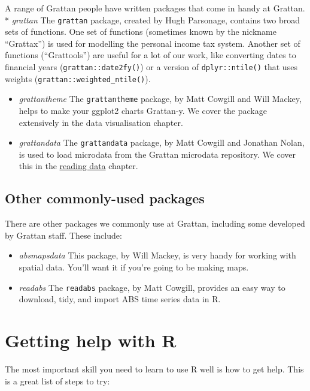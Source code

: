 \documentclass[
]{book}
\begin{document}
A range of Grattan people have written packages that come in handy at Grattan.
* \emph{grattan} The \texttt{grattan} package, created by Hugh Parsonage, contains two broad sets of functions. One set of functions (sometimes known by the nickname ``Grattax'') is used for modelling the personal income tax system. Another set of functions (``Grattools'') are useful for a lot of our work, like converting dates to financial years (\texttt{grattan::date2fy()}) or a version of \texttt{dplyr::ntile()} that uses weights (\texttt{grattan::weighted\_ntile()}).

\begin{itemize}
\item
  \emph{grattantheme} The \texttt{grattantheme} package, by Matt Cowgill and Will Mackey, helps to make your ggplot2 charts Grattan-y. We cover the package extensively in the data visualisation chapter.
\item
  \emph{grattandata} The \texttt{grattandata} package, by Matt Cowgill and Jonathan Nolan, is used to load microdata from the Grattan microdata repository. We cover this in the \protect\hyperlink{reading-data}{reading data} chapter.
\end{itemize}

\hypertarget{other-commonly-used-packages}{%
\section{Other commonly-used packages}\label{other-commonly-used-packages}}

There are other packages we commonly use at Grattan, including some developed by Grattan staff. These include:

\begin{itemize}
\item
  \emph{absmapsdata} This package, by Will Mackey, is very handy for working with spatial data. You'll want it if you're going to be making maps.
\item
  \emph{readabs} The \texttt{readabs} package, by Matt Cowgill, provides an easy way to download, tidy, and import ABS time series data in R.
\end{itemize}

\hypertarget{getting-help-with-r}{%
\chapter{Getting help with R}\label{getting-help-with-r}}

The most important skill you need to learn to use R well is how to get help. This is a great list of steps to try:
\end{document}
